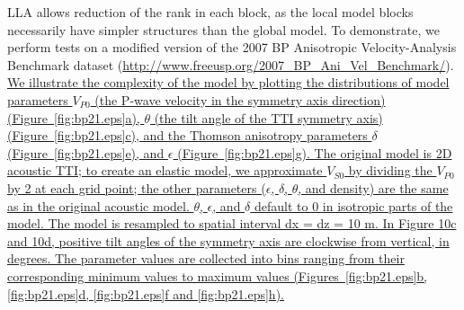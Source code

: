 \documentclass[manuscript,ulem,graphix,revised]{geophysics}
\begin{document}
LLA allows reduction of the rank in each block, as the local model blocks necessarily have simpler structures than the global model. To demonstrate, we perform tests on a modified version of the 2007 BP Anisotropic Velocity-Analysis Benchmark dataset (\url{http://www.freeusp.org/2007_BP_Ani_Vel_Benchmark/}).  
\marginnote{[29]}\uline{
We illustrate the complexity of the model by plotting the distributions of model parameters $V_{P0}$ (the P-wave velocity in the symmetry axis direction) (Figure~\ref{fig:bp21.eps}a), $\theta$ (the tilt angle of the TTI symmetry axis) (Figure~\ref{fig:bp21.eps}c), and the Thomson anisotropy parameters $\delta$ (Figure~\ref{fig:bp21.eps}e), and $\epsilon$ (Figure~\ref{fig:bp21.eps}g).  The original model is 2D acoustic TTI; to create an elastic model, we approximate $V_{S0}$ by dividing the $V_{P0}$ by 2 at each grid point; the other parameters ($\epsilon$, $\delta$, $\theta$, and density) are the same as in the original acoustic model. $\theta$, $\epsilon$, and $\delta$ default to 0 in isotropic parts of the model. The model is resampled to spatial interval dx = dz = 10 m.  In Figure 10c and 10d, positive tilt angles of the symmetry axis are clockwise from vertical, in degrees.
The parameter values are collected into bins ranging from their corresponding minimum values to maximum values (Figures~\ref{fig:bp21.eps}b, \ref{fig:bp21.eps}d, \ref{fig:bp21.eps}f and \ref{fig:bp21.eps}h). 
}
\end{document}
